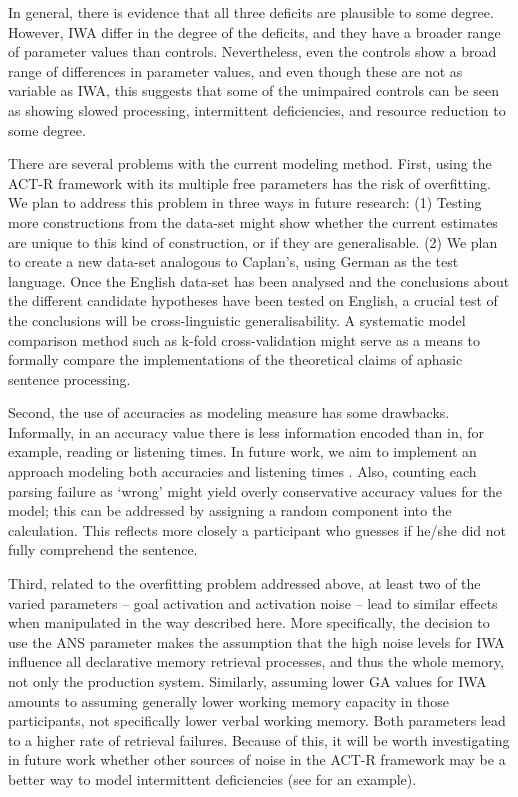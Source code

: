 \documentclass{cambridge7A}\usepackage[]{graphicx}\usepackage[]{color}
\begin{document}
In general, there is evidence that all three deficits are plausible to some degree. However, IWA differ in the degree of the deficits, and they have a broader range of parameter values than controls.
Nevertheless, even the controls show a broad range of differences in parameter values, and even though these are not as variable as IWA, this suggests that some of the unimpaired controls can be seen as showing slowed processing, intermittent deficiencies, and resource reduction to some degree.

There are several problems with the current modeling method. First, using the ACT-R framework with its multiple free parameters has the risk of overfitting. We plan to address this problem in three ways in future research: (1) Testing more constructions from the \cite{CaplanEtAl2015} data-set might show whether the current estimates are unique to this kind of construction, or if they are generalisable. (2) We plan to create a new data-set analogous to Caplan's, using German as the test language. Once the English data-set has been analysed and the conclusions about the different candidate hypotheses have been tested on English, a crucial test of the conclusions will be cross-linguistic generalisability.
A systematic model comparison method such as k-fold cross-validation might 
serve  as a means to formally compare the implementations of the theoretical claims of aphasic sentence processing.

Second, the use of accuracies as modeling measure has some drawbacks. Informally, in an accuracy value there is less information encoded than in, for example, reading or listening times. In future work, we aim to implement an approach modeling both accuracies and listening times \citep{NicenboimRetrieval2018}. Also, counting each parsing failure as `wrong' might yield overly conservative accuracy values for the model; this can be addressed by assigning a random component into the calculation. This reflects more closely a participant who guesses if he/she did not fully comprehend the sentence.

Third, related to the overfitting problem addressed above, at least two of the varied parameters -- goal activation and activation noise -- lead to similar effects when manipulated in the way described here. 
More specifically, the decision to use the ANS parameter makes the assumption that the high noise levels for IWA influence all declarative memory retrieval processes, and thus the whole memory, not only the production system. 
Similarly, assuming lower GA values for IWA amounts to assuming generally lower working memory capacity in those participants, not specifically lower verbal working memory.
Both parameters lead to a higher rate of retrieval failures. Because of this, it will be worth investigating in future work whether other sources of noise in the ACT-R framework may be a better way to model intermittent deficiencies (see \cite{PatilEtAl2016} for an example).
\end{document}
